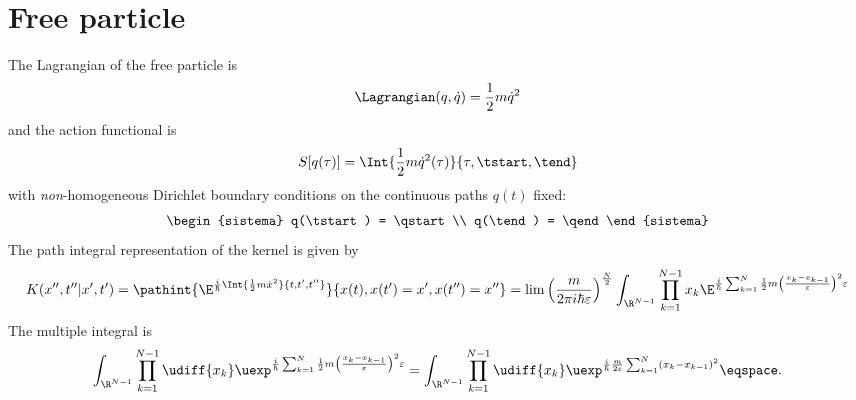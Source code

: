 
\section{Free particle}

The Lagrangian of the free particle is 
\begin{dmath*}
   \Lagrangian (q, \dot{q} ) = \frac{1}{2} m \dot{q}^{2}
\end{dmath*}
and the action functional is
\begin{dmath*}
   S[q(\tau)] = \Int{ \frac{1}{2} m \dot{q}^{2}(\tau) }{ \tau, \tstart, \tend}
\end{dmath*}
with \emph{non}-homogeneous Dirichlet boundary conditions on the continuous paths $q(t)$ fixed:
\begin{dmath*}
   \begin{sistema}
   q(\tstart) = \qstart\\
   q(\tend) = \qend
\end{sistema}
\end{dmath*}
The path integral representation of the kernel is given by
\begin{dmath}[label={particella libera}]
K(x'', t''|x',t') =
\pathint{%
   \E^{\frac{i}{\hbar} \Int{\frac{1}{2} m \dot{x}^{2}}{t, t', t''} }}
{x(t), x(t')=x', x(t'')=x''}  =
\lim \left( \frac{m}{2\pi i \hbar \varepsilon} \right)^{\frac{N}{2}}
\int_{\R^{N-1}} \prod_{k=1}^{N-1} x_{k} \E^{ \frac{i}{\hbar}
\sum_{k=1}^{N} \frac{1}{2} m \left( \frac{x_{k} - x_{k-1}}{\varepsilon}
\right)^{2} \varepsilon }  
\end{dmath}
The multiple integral is
\begin{dmath}
\int_{\R^{N-1}} \prod_{k=1}^{N-1} \udiff{x_{k}} \uexp^{ \frac{i}{\hbar}
\sum_{k=1}^{N} \frac{1}{2} m \left( \frac{x_{k} - x_{k-1}}{\varepsilon}
\right)^{2} \varepsilon }  = 
\int_{\R^{N-1}} \prod_{k=1}^{N-1} \udiff{x_{k}} \uexp^{ \frac{i}{\hbar}
\frac{m}{2\varepsilon}
\sum_{k=1}^{N} \left(  x_{k} - x_{k-1} \right)^{2} } \eqspace .
\end{dmath}

